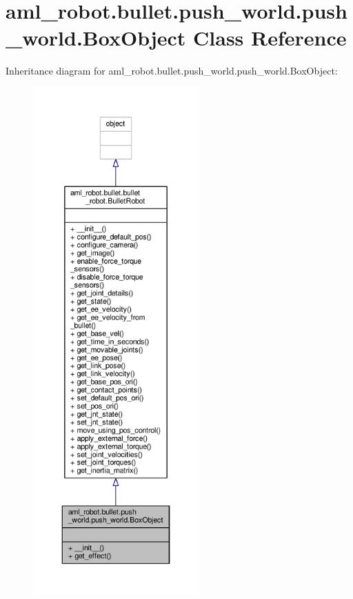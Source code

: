 \hypertarget{classaml__robot_1_1bullet_1_1push__world_1_1push__world_1_1_box_object}{\section{aml\-\_\-robot.\-bullet.\-push\-\_\-world.\-push\-\_\-world.\-Box\-Object Class Reference}
\label{classaml__robot_1_1bullet_1_1push__world_1_1push__world_1_1_box_object}
}


Inheritance diagram for aml\-\_\-robot.\-bullet.\-push\-\_\-world.\-push\-\_\-world.\-Box\-Object\-:
\nopagebreak
\begin{figure}[H]
\begin{center}
\leavevmode
\includegraphics[height=550pt]{classaml__robot_1_1bullet_1_1push__world_1_1push__world_1_1_box_object__inherit__graph}
\end{center}
\end{figure}


